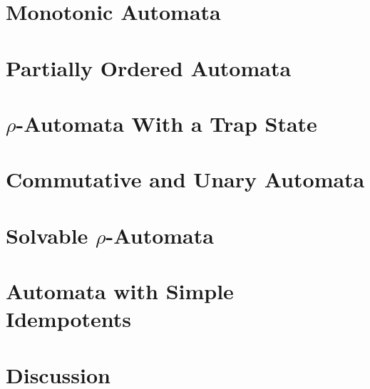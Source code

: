 


\section{Monotonic Automata}%
\label{constr_sync:subsec:monotonic_aut}



\section{Partially Ordered Automata}
\label{constr_input:subsec:pto}



\section{\texorpdfstring{$\rho$}{rho}-Automata With a Trap State}
\label{constr_input:subsec:rho} 

 

\section{Commutative and Unary Automata}
\label{constr_input:subsec:comm}



\section{Solvable \texorpdfstring{$\rho$}{rho}-Automata}
\label{constr_input:subsec:solvable}



\section{Automata with Simple Idempotents}
\label{constr_input:subsec:SI-automata}



\section{Discussion}
\label{constr_input:sec:discussion}


